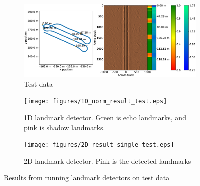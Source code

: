 \begin{figure} [hb] %
     \centering
    \begin{subfigure}[t]{0.9\textwidth}
         \centering
         \includegraphics[trim=0cm 4cm 0cm 4.5cm, clip=true, width=\textwidth]{figures/path_sonar_colorbars_test.eps}
         \caption{Test data}
         \label{fig:test_data}
     \end{subfigure}
     \hfill
     \begin{subfigure}[b]{0.44\textwidth}
         \centering
         \texttt{[image: figures/1D\_norm\_result\_test.eps]}
         \caption{1D landmark detector. Green is echo landmarks, and pink is shadow landmarks.}
         \label{fig:1D_norm_result_test}
     \end{subfigure}
     \begin{subfigure}[b]{0.44\textwidth}
         \centering
         \texttt{[image: figures/2D\_result\_single\_test.eps]}
         \caption{2D landmark detector. Pink is the detected landmarks}
         \label{fig:2D_result_single_test}
     \end{subfigure}
        \caption{Results from running landmark detectors on test data}
        \label{fig:landmark_detection_test_data}
\end{figure}
